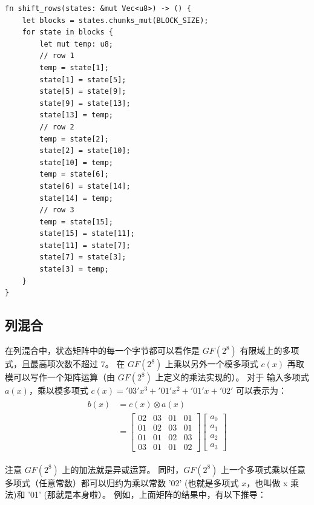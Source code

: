 \documentclass[degree=project,degree-type=project,cjk-font=noto]{thuthesis}
\begin{document}
  \begin{verbatim}
fn shift_rows(states: &mut Vec<u8>) -> () {
    let blocks = states.chunks_mut(BLOCK_SIZE);
    for state in blocks {
        let mut temp: u8;
        // row 1
        temp = state[1];
        state[1] = state[5];
        state[5] = state[9];
        state[9] = state[13];
        state[13] = temp;
        // row 2
        temp = state[2];
        state[2] = state[10];
        state[10] = temp;
        temp = state[6];
        state[6] = state[14];
        state[14] = temp;
        // row 3
        temp = state[15];
        state[15] = state[11];
        state[11] = state[7];
        state[7] = state[3];
        state[3] = temp;
    }
}
  \end{verbatim}

\subsection{列混合}

在列混合中，状态矩阵中的每一个字节都可以看作是 $GF(2^8)$ 有限域上的多项式，且最高项次数不超过 $7$。
在 $GF(2^8)$ 上乘以另外一个模多项式 $c(x)$ 再取模可以写作一个矩阵运算（由 $GF(2^8)$ 上定义的乘法实现的）。
对于 输入多项式 $a(x)$，乘以模多项式 $c(x) = '03'x^3+'01'x^2+'01'x+'02'$ 可以表示为：
\begin{align}
  \begin{split}
    b(x) &= c(x) \otimes a(x) \\
    &= \begin{bmatrix}
      02 & 03 & 01 & 01 \\
      01 & 02 & 03 & 01 \\
      01 & 01 & 02 & 03 \\
      03 & 01 & 01 & 02
    \end{bmatrix} \begin{bmatrix}
      a_0 \\
      a_1 \\
      a_2 \\
      a_3
    \end{bmatrix}
  \end{split}
\end{align}

注意 $GF(2^8)$ 上的加法就是异或运算。
同时，$GF(2^8)$ 上一个多项式乘以任意多项式（任意常数）都可以归约为乘以常数 '02' (也就是多项式 $x$，也叫做 x 乘法)和 '01' (那就是本身啦）。
例如，上面矩阵的结果中，有以下推导：
\end{document}
